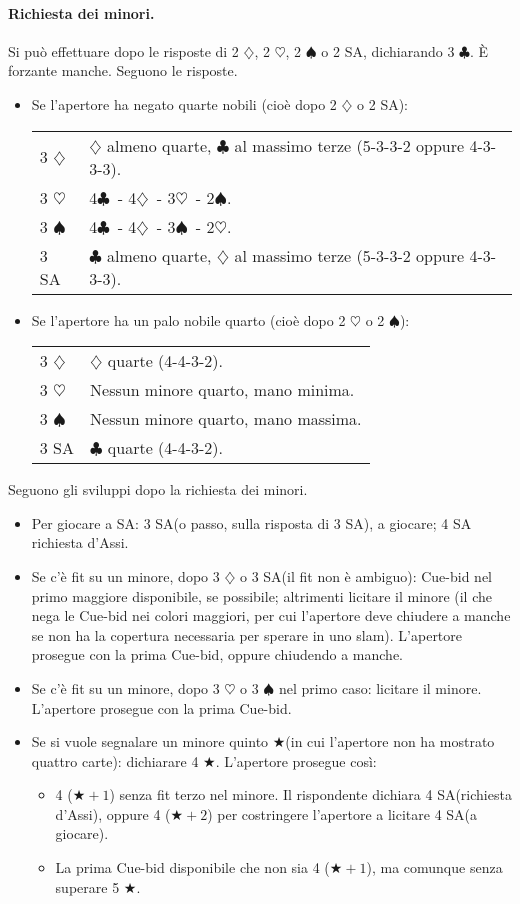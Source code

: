 \documentclass[a4paper,10pt]{article}
\renewcommand{\c}{$\clubsuit$\xspace}
\renewcommand{\d}{$\diamondsuit$\xspace}
\newcommand{\h}{$\heartsuit$\xspace}
\newcommand{\s}{$\spadesuit$\xspace}
\renewcommand{\j}{$\bigstar$\xspace}
\newcommand{\sa}{SA\xspace}
\newcommand{\smallspace}{\vskip0.3cm}
\newenvironment{twocol}
  {\smallspace\noindent\begin{tabular}{l p{0.8\textwidth}}}
  {\end{tabular}\smallspace}
\begin{document}
\paragraph{Richiesta dei minori.} Si può effettuare dopo le risposte di 2 \d, 2 \h, 2 \s o 2 \sa, dichiarando 3 \c. È forzante manche. Seguono le risposte.

\begin{itemize}
 \item Se l'apertore ha negato quarte nobili (cioè dopo 2 \d o 2 \sa):
  \begin{twocol}
    3 \d & \d almeno quarte, \c al massimo terze (5-3-3-2 oppure 4-3-3-3).\\
    3 \h & 4\c\ - 4\d\ - 3\h\ - 2\s.\\
    3 \s & 4\c\ - 4\d\ - 3\s\ - 2\h.\\
    3 \sa & \c almeno quarte, \d al massimo terze (5-3-3-2 oppure 4-3-3-3).
  \end{twocol}

 \item Se l'apertore ha un palo nobile quarto (cioè dopo 2 \h o 2 \s):
  \begin{twocol}
    3 \d & \d quarte (4-4-3-2).\\
    3 \h & Nessun minore quarto, mano minima.\\
    3 \s & Nessun minore quarto, mano massima.\\
    3 \sa & \c quarte (4-4-3-2).
  \end{twocol}
\end{itemize}

\noindent Seguono gli sviluppi dopo la richiesta dei minori.
\begin{itemize}
 \item Per giocare a \sa: 3 \sa (o passo, sulla risposta di 3 \sa), a giocare; 4 \sa richiesta d'Assi.
 \item Se c'è fit su un minore, dopo 3 \d o 3 \sa (il fit non è ambiguo): Cue-bid nel primo maggiore disponibile, se possibile; altrimenti licitare il minore (il che nega le Cue-bid nei colori maggiori, per cui l'apertore deve chiudere a manche se non ha la copertura necessaria per sperare in uno slam).
 L'apertore prosegue con la prima Cue-bid, oppure chiudendo a manche.
 \item Se c'è fit su un minore, dopo 3 \h o 3 \s nel primo caso: licitare il minore.
 L'apertore prosegue con la prima Cue-bid.
 \item Se si vuole segnalare un minore quinto \j (in cui l'apertore non ha mostrato quattro carte): dichiarare 4 \j.
 L'apertore prosegue così:
 \begin{itemize}
  \item 4 ($\bigstar+1$) senza fit terzo nel minore. Il rispondente dichiara 4 \sa (richiesta d'Assi), oppure 4 ($\bigstar+2$) per costringere l'apertore a licitare 4 \sa (a giocare).
  \item La prima Cue-bid disponibile che non sia 4 ($\bigstar+1$), ma comunque senza superare 5 \j.
  
 \end{itemize}
\end{itemize}
\end{document}
